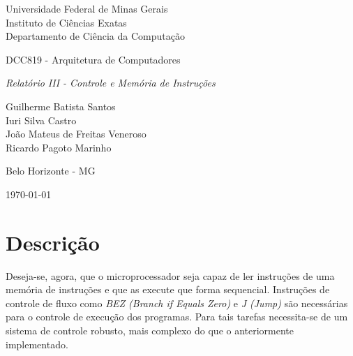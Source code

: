 \documentclass[11pt,a4paper,titlepage]{article}
\newcommand{\titulo}{\textit{Relatório III - Controle e Memória de Instruções}}
\begin{document}
\begin{titlepage}
\begin{center}

\begin{large}
Universidade Federal de Minas Gerais\\
Instituto de Ciências Exatas\\
Departamento de Ciência da Computação\\
\end{large}

\vspace{20mm}

\begin{Large}
DCC819 - Arquitetura de Computadores
\end{Large}

\vspace{20mm}

\begin{LARGE}
\titulo
\end{LARGE}


\vspace{30mm}

\begin{Large}
\begin{center}
Guilherme Batista Santos\\ Iuri Silva Castro\\ João Mateus de Freitas Veneroso\\ Ricardo Pagoto Marinho \\
\end{center}
\end{Large}


\vspace{60mm}

{\sc Belo Horizonte - MG}

{\sc \today}

\end{center}
\end{titlepage}


\section{Descrição}\label{sec:desc}

Deseja-se, agora, que o microprocessador seja capaz de ler instruções de uma memória de instruções e que as execute que forma sequencial. Instruções de controle de fluxo como \textit{BEZ (Branch if Equals Zero)} e \textit{J (Jump)} são necessárias para o controle de execução dos programas. Para tais tarefas necessita-se de um sistema de controle robusto, mais complexo do que o anteriormente implementado. 
\end{document}
